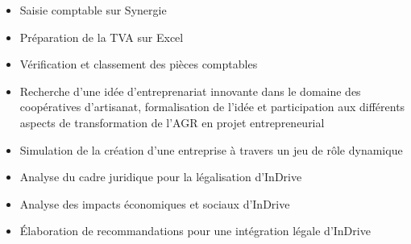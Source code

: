 \documentclass[10pt,a4paper]{altacv}
\begin{document}
\divider

\begin{itemize}
\item Saisie comptable sur Synergie
\item Préparation de la TVA sur Excel
\item Vérification et classement des pièces comptables
\end{itemize}


\begin{itemize}
\item Recherche d'une idée d'entreprenariat innovante dans le domaine des coopératives d'artisanat, formalisation de l'idée et participation aux différents aspects de transformation de l'AGR en projet entrepreneurial
\item Simulation de la création d'une entreprise à travers un jeu de rôle dynamique
\end{itemize}

\divider

\begin{itemize}
\item Analyse du cadre juridique pour la légalisation d'InDrive
\item Analyse des impacts économiques et sociaux d'InDrive
\item Élaboration de recommandations pour une intégration légale d'InDrive
\end{itemize}

\divider
\end{document}
